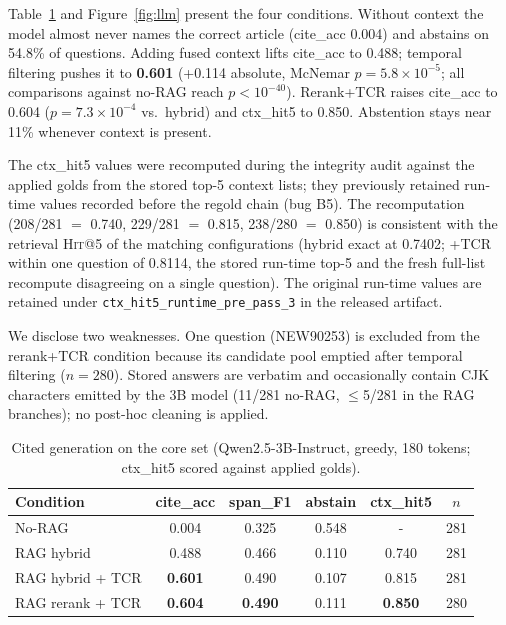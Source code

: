 \documentclass[10pt,a4paper,twocolumn]{article}
\newcommand{\hit}{\textsc{Hit}}
\newcommand{\code}[1]{\texttt{#1}}
\begin{document}
Table~\ref{tab:core-llm} and Figure~\ref{fig:llm} present the four conditions. Without context the model almost never names the correct article (cite\_acc 0.004) and abstains on 54.8\% of questions. Adding fused context lifts cite\_acc to 0.488; temporal filtering pushes it to \textbf{0.601} (+0.114 absolute, McNemar $p=5.8\times10^{-5}$; all comparisons against no-RAG reach $p<10^{-40}$). Rerank+TCR raises cite\_acc to 0.604 ($p=7.3\times10^{-4}$ vs.\ hybrid) and ctx\_hit5 to 0.850. Abstention stays near 11\% whenever context is present.

The ctx\_hit5 values were recomputed during the integrity audit against the applied golds from the stored top-5 context lists; they previously retained run-time values recorded before the regold chain (bug B5). The recomputation (208/281 $=$ 0.740, 229/281 $=$ 0.815, 238/280 $=$ 0.850) is consistent with the retrieval \hit{}@5 of the matching configurations (hybrid exact at 0.7402; +TCR within one question of 0.8114, the stored run-time top-5 and the fresh full-list recompute disagreeing on a single question). The original run-time values are retained under \code{ctx\_hit5\_runtime\_pre\_pass\_3} in the released artifact.

We disclose two weaknesses. One question (NEW90253) is excluded from the rerank+TCR condition because its candidate pool emptied after temporal filtering ($n{=}280$). Stored answers are verbatim and occasionally contain CJK characters emitted by the 3B model (11/281 no-RAG, $\le$5/281 in the RAG branches); no post-hoc cleaning is applied.

\begin{table}[t]
\centering\footnotesize
\caption{Cited generation on the core set (Qwen2.5-3B-Instruct, greedy, 180 tokens; ctx\_hit5 scored against applied golds).}
\label{tab:core-llm}
\setlength{\tabcolsep}{2.6pt}
\begin{tabular}{lccccc}
\toprule
Condition & cite\_acc & span\_F1 & abstain & ctx\_hit5 & $n$ \\
\midrule
No-RAG & 0.004 & 0.325 & 0.548 & - & 281 \\
RAG hybrid & 0.488 & 0.466 & 0.110 & 0.740 & 281 \\
RAG hybrid + TCR & \textbf{0.601} & 0.490 & 0.107 & 0.815 & 281 \\
RAG rerank + TCR & \textbf{0.604} & \textbf{0.490} & 0.111 & \textbf{0.850} & 280 \\
\bottomrule
\end{tabular}
\end{table}
\end{document}
